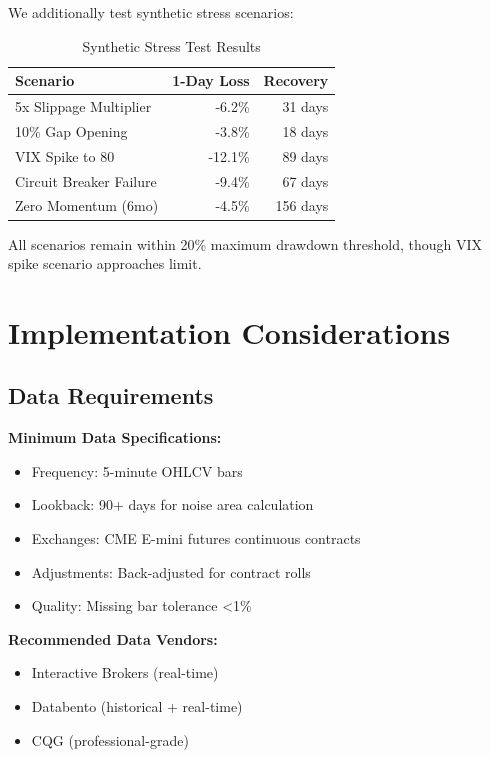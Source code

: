 \documentclass[twocolumn,ieee]{arithmaxresearch}
\begin{document}
We additionally test synthetic stress scenarios:

\begin{table}[h]
\centering
\caption{Synthetic Stress Test Results}
\label{tab:stress_tests}
\begin{tabular}{@{}lrr@{}}
\toprule
\textbf{Scenario} & \textbf{1-Day Loss} & \textbf{Recovery} \\
\midrule
5x Slippage Multiplier & -6.2\% & 31 days \\
10\% Gap Opening & -3.8\% & 18 days \\
VIX Spike to 80 & -12.1\% & 89 days \\
Circuit Breaker Failure & -9.4\% & 67 days \\
Zero Momentum (6mo) & -4.5\% & 156 days \\
\bottomrule
\end{tabular}
\end{table}

All scenarios remain within 20\% maximum drawdown threshold, though VIX spike scenario approaches limit.

\section{Implementation Considerations}

\subsection{Data Requirements}

\textbf{Minimum Data Specifications:}
\begin{itemize}
    \item Frequency: 5-minute OHLCV bars
    \item Lookback: 90+ days for noise area calculation
    \item Exchanges: CME E-mini futures continuous contracts
    \item Adjustments: Back-adjusted for contract rolls
    \item Quality: Missing bar tolerance <1\%
\end{itemize}

\textbf{Recommended Data Vendors:}
\begin{itemize}
    \item Interactive Brokers (real-time)
    \item Databento (historical + real-time)
    \item CQG (professional-grade)
\end{itemize}
\end{document}
